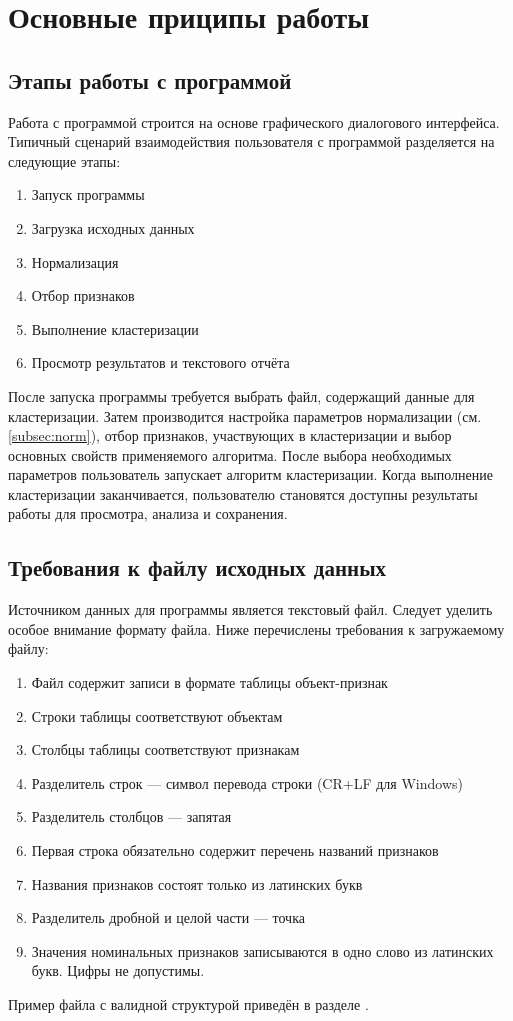 \documentclass[12pt,tikz]{instruction}
\begin{document}
\section{Основные приципы работы}

\subsection{Этапы работы с программой}
Работа с программой \SysName строится на основе графического диалогового интерфейса. Типичный сценарий взаимодействия пользователя с программой разделяется на следующие этапы:
\begin{enumerate}
	\item Запуск программы
	\item Загрузка исходных данных
	\item Нормализация
	\item Отбор признаков
	\item Выполнение кластеризации
	\item Просмотр результатов и текстового отчёта
\end{enumerate}

После запуска программы требуется выбрать файл, содержащий данные для кластеризации. Затем производится настройка параметров нормализации (см. \ref{subsec:norm}), отбор признаков, участвующих в кластеризации и выбор основных свойств применяемого алгоритма. После выбора необходимых параметров пользователь запускает алгоритм кластеризации. Когда выполнение кластеризации заканчивается, пользователю становятся доступны результаты работы для просмотра, анализа и сохранения. 

\subsection{Требования к файлу исходных данных}
\label{subsec:req}
Источником данных для программы является текстовый файл. Следует уделить особое внимание формату файла. Ниже перечислены требования к загружаемому файлу:
\begin{enumerate}
	\item Файл содержит записи в формате таблицы объект-признак
	\item Строки таблицы соответствуют объектам
	\item Столбцы таблицы соответствуют признакам
	\item Разделитель строк --- символ перевода строки (CR+LF для Windows)
	\item Разделитель столбцов --- запятая
	\item Первая строка обязательно содержит перечень названий признаков
	\item Названия признаков состоят только из латинских букв
	\item Разделитель дробной и целой части --- точка
	\item Значения номинальных признаков записываются в одно слово из латинских букв. Цифры не допустимы.
\end{enumerate}
Пример файла с  валидной структурой приведён в разделе .
\end{document}
